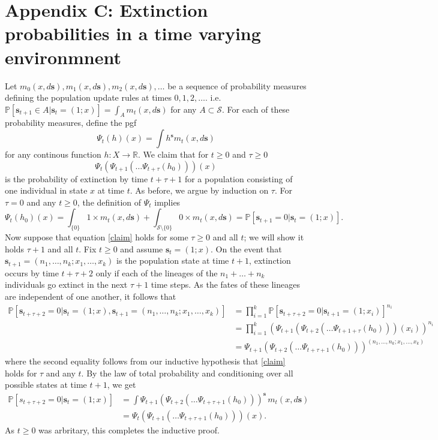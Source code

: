 \documentclass[12pt]{amsart}\usepackage[]{graphicx}\usepackage[]{color}
\def\R{\mathbb R}
\def\P{\mathbb P}
\def\S{\mathcal S}
\def\s{\mathbf s}
\begin{document}
\newpage

\section*{Appendix C: Extinction probabilities in a time varying environmnent}


Let $m_0(x,d\s),m_1(x,d\s),m_2(x,d\s),\dots$ be a sequence of probability measures defining the population update rules at times $0,1,2,\dots.$ i.e. $\P[\s_{t+1}\in A| \s_t =(1;x)]=\int_A m_t(x, d\s)$ for any $A\subset \S$. For each of these probability measures, define the pgf
\[
\Psi_t(h)(x)=\int h^\s m_t(x,d\s)
\]
for any continous function $h:X\to\R$. We claim that for $t\ge 0$ and $\tau\ge 0$
\begin{equation}\label{claim}
\Psi_{t}(\Psi_{t+1}(\dots \Psi_{t+\tau}(h_0)))(x)
\end{equation}
is the probability of extinction by time $t+\tau+1$ for a population consisting of one individual in state $x$ at time $t$. As before, we argue by induction on $\tau$. For $\tau=0$ and any $t\ge 0$, the definition of $\Psi_t$ implies
\begin{equation}\label{starstarstar}
\Psi_t(h_0)(x)=\int_{\{0\}} 1\times m_t(x, d\s)+\int_{\S\setminus \{0\}} 0\times m_t(x,d\s)= \P[\s_{t+1}=0|\s_t=(1;x)].
\end{equation}
Now suppose that equation \eqref{claim} holds for some $\tau\ge 0$ and all $t$; we will show it holds $\tau+1$ and all $t$. Fix $t\ge 0$ and assume $\s_t=(1;x)$.  On the event that $\s_{t+1}=(n_1, \dots, n_k;x_1, \dots, x_k)$ is the population state at time $t+1$, extinction occurs by time $t+\tau+2$ only if each of the lineages of the $n_1+\dots +n_k$ individuals go extinct in the next $\tau+1$ time steps. As the fates of these lineages are independent of one another, it follows that
\[
\begin{aligned}
\P[\s_{t+\tau+2}=0|\s_{t}=(1; x), \s_{t+1}=(n_1, \dots, n_k;x_1, \dots, x_k)]&= \prod_{i=1}^k \P[\s_{t+\tau+2}=0|\s_{t+1}=(1; x_i)]^{n_i}\\
&=\prod_{i=1}^k\left(\Psi_{t+1}(\Psi_{t+2}(\dots \Psi_{t+1+\tau}(h_0)))(x_i)\right)^{n_i}\\
&=\Psi_{t+1}(\Psi_{t+2}(\dots \Psi_{t+\tau+1}(h_0)))^{(n_1, \dots, n_k;x_1, \dots, x_k)}
\end{aligned}
\]
where the second equality follows from our inductive hypothesis that \eqref{claim} holds for $\tau$ and any $t$. By the law of total probability and conditioning over all possible states at time $t+1$, we get
\[
\begin{aligned}
\P[s_{t+\tau+2}=0|\s_t=(1;x)]&=\int \Psi_{t+1}(\Psi_{t+2}(\dots \Psi_{t+\tau+1}(h_0)))^{\s} \, m_t(x,d\s)\\
&=\Psi_{t}(\Psi_{t+1}(\dots \Psi_{t+\tau+1}(h_0)))(x).
\end{aligned}
\]
As $t\ge 0$ was arbritary, this completes the inductive proof.
\end{document}
